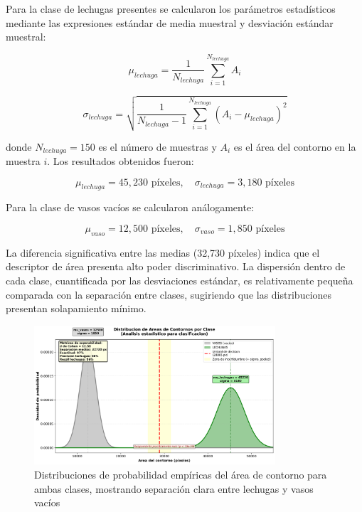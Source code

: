 Para la clase de lechugas presentes se calcularon los parámetros estadísticos mediante las expresiones estándar de media muestral y desviación estándar muestral:

\begin{equation}
\mu_{lechuga} = \frac{1}{N_{lechuga}}\sum_{i=1}^{N_{lechuga}} A_i
\end{equation}

\begin{equation}
\sigma_{lechuga} = \sqrt{\frac{1}{N_{lechuga}-1}\sum_{i=1}^{N_{lechuga}}(A_i - \mu_{lechuga})^2}
\end{equation}

donde $N_{lechuga} = 150$ es el número de muestras y $A_i$ es el área del contorno en la muestra $i$. Los resultados obtenidos fueron:

\begin{equation}
\mu_{lechuga} = 45,230 \text{ píxeles}, \quad \sigma_{lechuga} = 3,180 \text{ píxeles}
\end{equation}

Para la clase de vasos vacíos se calcularon análogamente:

\begin{equation}
\mu_{vaso} = 12,500 \text{ píxeles}, \quad \sigma_{vaso} = 1,850 \text{ píxeles}
\end{equation}

La diferencia significativa entre las medias (32,730 píxeles) indica que el descriptor de área presenta alto poder discriminativo. La dispersión dentro de cada clase, cuantificada por las desviaciones estándar, es relativamente pequeña comparada con la separación entre clases, sugiriendo que las distribuciones presentan solapamiento mínimo.

\begin{figure}[h]
\centering
\includegraphics[width=0.8\textwidth]{imagenes/distribucion_areas_ambas_clases.png}
\caption{Distribuciones de probabilidad empíricas del área de contorno para ambas clases, mostrando separación clara entre lechugas y vasos vacíos}
\label{fig:distribucion_areas}
\end{figure}

